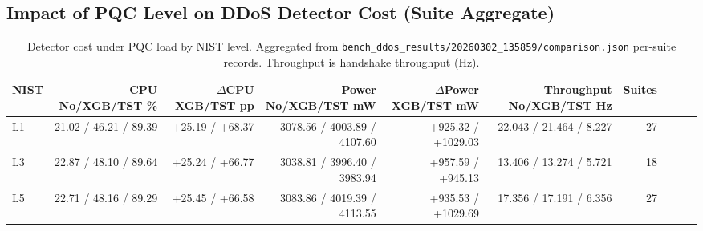 \subsection{Impact of PQC Level on DDoS Detector Cost (Suite Aggregate)}
\begin{table}[t]
\centering
\caption{Detector cost under PQC load by NIST level. Aggregated from \texttt{bench\_ddos\_results/20260302\_135859/comparison.json} per-suite records. Throughput is handshake throughput (Hz).}
\footnotesize
\setlength{\tabcolsep}{3.5pt}
\begin{tabular}{@{}lrrrrrrrrr@{}}\toprule
NIST & CPU No/XGB/TST \% & $\Delta$CPU XGB/TST pp & Power No/XGB/TST mW & $\Delta$Power XGB/TST mW & Throughput No/XGB/TST Hz & Suites \\ \midrule
L1 & 21.02 / 46.21 / 89.39 & +25.19 / +68.37 & 3078.56 / 4003.89 / 4107.60 & +925.32 / +1029.03 & 22.043 / 21.464 / 8.227 & 27 \\
L3 & 22.87 / 48.10 / 89.64 & +25.24 / +66.77 & 3038.81 / 3996.40 / 3983.94 & +957.59 / +945.13 & 13.406 / 13.274 / 5.721 & 18 \\
L5 & 22.71 / 48.16 / 89.29 & +25.45 / +66.58 & 3083.86 / 4019.39 / 4113.55 & +935.53 / +1029.69 & 17.356 / 17.191 / 6.356 & 27 \\
\bottomrule\end{tabular}
\label{tab:pqc-impact-on-ddos}
\end{table}

